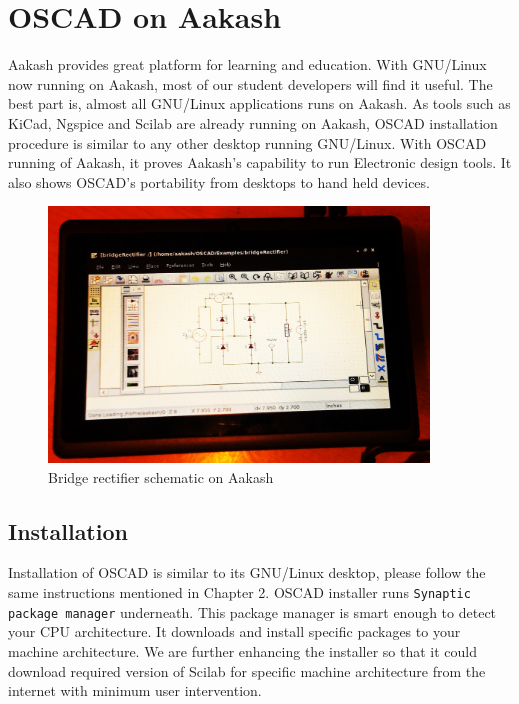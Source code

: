 \chapter {OSCAD on Aakash}
\label{chap11}

Aakash provides great platform for learning and education. With
GNU/Linux now running on Aakash, most of our student developers will
find it useful. The best part is, almost all GNU/Linux applications
runs on Aakash. As tools such as KiCad, Ngspice and Scilab are already
running on Aakash, OSCAD installation procedure is similar to any
other desktop running GNU/Linux. With OSCAD running of Aakash, it
proves Aakash's capability to run Electronic design tools. It also
shows OSCAD's portability from desktops to hand held devices.

\begin{figure}[h!]
\centering
\includegraphics[width=0.9\textwidth]{figures/aakash_br.png}
\caption{Bridge rectifier schematic on Aakash}
\label{fig: Bridge rectifier schematic on Aakash}
\end{figure}


\section{Installation}

Installation of OSCAD is similar to its GNU/Linux desktop, please
follow the same instructions mentioned in Chapter 2. OSCAD installer
runs {\tt Synaptic package manager} underneath. This package manager
is smart enough to detect your CPU architecture. It downloads and
install specific packages to your machine architecture. We are
further enhancing the installer so that it could download required
version of Scilab for specific machine architecture from the internet
with minimum user intervention.

